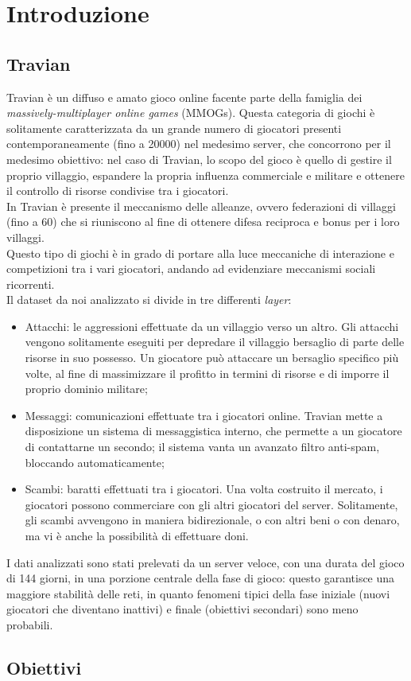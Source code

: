 \chapter{Introduzione}
\section{Travian}
Travian è un diffuso e amato gioco online facente parte della famiglia dei \textit{massively-multiplayer online games} (MMOGs).
Questa categoria di giochi è solitamente caratterizzata da un grande numero di giocatori presenti contemporaneamente (fino a 20000) nel medesimo server, che concorrono per il medesimo obiettivo: nel caso di Travian, lo scopo del gioco è quello di gestire il proprio villaggio, espandere la propria influenza commerciale e militare e ottenere il controllo di risorse condivise tra i giocatori.\\
In Travian è presente il meccanismo delle alleanze, ovvero federazioni di villaggi (fino a 60) che si riuniscono al fine di ottenere difesa reciproca e bonus per i loro villaggi.\\
Questo tipo di giochi è in grado di portare alla luce meccaniche di interazione e competizioni tra i vari giocatori, andando ad evidenziare meccanismi sociali ricorrenti.\\
Il dataset da noi analizzato si divide in tre differenti \textit{layer}:

\begin{itemize}
	\item Attacchi: le aggressioni effettuate da un villaggio verso un altro. Gli attacchi vengono solitamente eseguiti per depredare il villaggio bersaglio di parte delle risorse in suo possesso. Un giocatore può attaccare un bersaglio specifico più volte, al fine di massimizzare il profitto in termini di risorse e di imporre il proprio dominio militare;
	\item Messaggi: comunicazioni effettuate tra i giocatori online. Travian mette a disposizione un sistema di messaggistica interno, che permette a un giocatore di contattarne un secondo; il sistema vanta un avanzato filtro anti-spam, bloccando automaticamente;
	\item Scambi: baratti effettuati tra i giocatori. Una volta costruito il mercato, i giocatori possono commerciare con gli altri giocatori del server. Solitamente, gli scambi avvengono in maniera bidirezionale, o con altri beni o con denaro, ma vi è anche la possibilità di effettuare doni.
\end{itemize}
I dati analizzati sono stati prelevati da un server veloce, con una durata del gioco di 144 giorni, in una porzione centrale della fase di gioco: questo garantisce una maggiore stabilità delle reti, in quanto fenomeni tipici della fase iniziale (nuovi giocatori che diventano inattivi) e finale (obiettivi secondari) sono meno probabili.

\section{Obiettivi}
